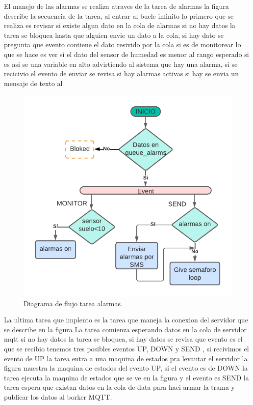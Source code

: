 El manejo de las alarmas se realiza atraves de la tarea de alarmas la figura describe la secuencia de la tarea, 
al entrar al bucle infinito lo primero que se realiza es revisar si existe algun dato en la cola de alarmas si no hay datos la tarea se bloquea hasta que alguien envie un dato a la cola, si hay dato se pregunta que evento contiene el dato resivido por la cola si es de monitorear lo que se hace es ver si el dato del sensor de humedad es menor al rango esperado si es asi se una variable en alto advirtiendo al sistema que hay una alarma, si se recicivio el evento de enviar se revisa si hay alarmas activas si hay se envia un mensaje de texto al 

\begin{figure}[htbp]
  \centering
	\includegraphics[width=1\textwidth]{./Figures/DF_alarms.png}
	\caption{Diagrama de flujo tarea alarmas.}
	\label{fig:Df tarea alarms}
\end{figure}

La ultima tarea que implento es la tarea que maneja la conexion del servidor que se describe en la figura 
La tarea comienza esperando datos en la cola de servidor mqtt si no hay datos la tarea se bloquea, si hay datos se revisa que evento es el que se recibio tenemos tres posibles eventos UP, DOWN y SEND ,
si recivimos el evento de UP la tarea entra a una maquina de estados pra levantar el servidor la figura muestra la maquina de estados del evento UP, si el evento es de DOWN la tarea ejecuta la maquina de estados que se ve en la figura y el evento es SEND la tarea espera que existan datos en la cola de data para haci armar la trama y publicar los datos al borker MQTT.

